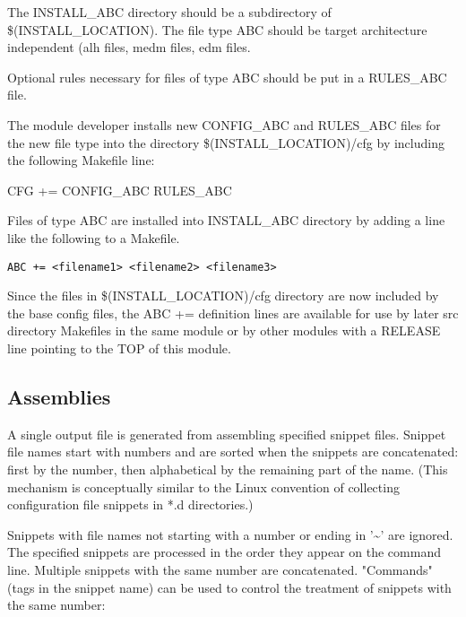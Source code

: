 The INSTALL\_ABC directory should be a subdirectory of \$(INSTALL\_LOCATION). The file type ABC should be 
target architecture independent (alh files, medm files, edm files.

Optional rules necessary for files of type ABC should be put in a RULES\_ABC file.

The module developer installs new CONFIG\_ABC and RULES\_ABC files for the new file type into the directory 
\$(INSTALL\_LOCATION)/cfg by including the following Makefile line:

\begin{description}
\item {}CFG += CONFIG\_ABC RULES\_ABC

\end{description}

Files of type ABC are installed into INSTALL\_ABC directory by adding a line like the following to a Makefile.

\begin{description}
\item \verb|ABC += <filename1> <filename2> <filename3>|

\end{description}

Since the files in \$(INSTALL\_LOCATION)/cfg directory are now included by the base config files, the ABC += 
definition lines are available for use by later src directory Makefiles in the same module or by other modules with a 
RELEASE line pointing to the TOP of this module.

\subsection{Assemblies}

A single output file is generated from assembling specified snippet files.
Snippet file names start with numbers and are sorted when the snippets are concatenated:
first by the number, then alphabetical by the remaining part of the name.
(This mechanism is conceptually similar to the Linux convention of collecting configuration file snippets
in *.d directories.)

Snippets with file names not starting with a number or ending in '\textasciitilde' are ignored. 
The specified snippets are processed in the order they appear on the command line.
Multiple snippets with the same number are concatenated.
"Commands" (tags in the snippet name) can be used to control the treatment of snippets with
the same number:

